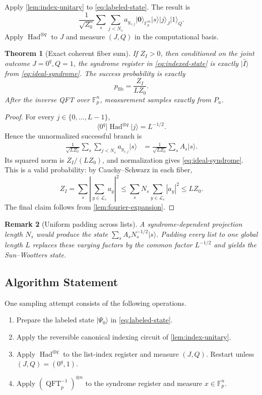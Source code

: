 \documentclass[10pt,a4paper]{amsart}
\newtheorem{theorem}{Theorem}[section]
\newtheorem{remark}[theorem]{Remark}
\newcommand{\F}{\mathbb{F}}
\newcommand{\Lcal}{\mathcal{L}}
\newcommand{\ket}[1]{\lvert #1\rangle}
\newcommand{\abs}[1]{\left\lvert #1\right\rvert}
\newcommand{\QFT}{\operatorname{QFT}}
\newcommand{\Had}{\operatorname{Had}}
\begin{document}
Apply \cref{lem:index-unitary} to \cref{eq:labeled-state}.  The result is
\begin{equation}
   \frac1{\sqrt{Z_0}}
   \sum_s\sum_{j<N_s}a_{y_{s,j}}\ket{\mathbf 0}_{\F_p^m}\ket{s}\ket{j}_J\ket1_Q.
   \label{eq:indexed-state}
\end{equation}
Apply $\Had^{\otimes q}$ to $J$ and measure $(J,Q)$ in the computational basis.

\begin{theorem}[Exact coherent fiber sum]
\label{thm:exact-fiber-sum}
If $Z_I>0$, then conditioned on the joint outcome $J=0^q,Q=1$, the syndrome register in \cref{eq:indexed-state} is exactly $\ket{\widehat I}$ from \cref{eq:ideal-syndrome}.  The success probability is exactly
\begin{equation}
   p_{\mathrm{fib}}=\frac{Z_I}{LZ_0}.
   \label{eq:success-exact}
\end{equation}
After the inverse QFT over $\F_p^n$, measurement samples exactly from $P_u$.
\end{theorem}

\begin{proof}
For every $j\in\{0,\ldots,L-1\}$,
\[
   \langle0^q\vert \Had^{\otimes q}\vert j\rangle=L^{-1/2}.
\]
Hence the unnormalized successful branch is
\begin{align*}
   \frac1{\sqrt{LZ_0}}\sum_s\sum_{j<N_s}a_{y_{s,j}}\ket{s}
   &=\frac1{\sqrt{LZ_0}}\sum_sA_s\ket{s}.
\end{align*}
Its squared norm is $Z_I/(LZ_0)$, and normalization gives \cref{eq:ideal-syndrome}.  This is a valid probability: by Cauchy--Schwarz in each fiber,
\[
   Z_I=\sum_s\abs{\sum_{y\in\Lcal_s}a_y}^2
      \le\sum_sN_s\sum_{y\in\Lcal_s}\abs{a_y}^2
      \le LZ_0.
\]
The final claim follows from \cref{lem:fourier-expansion}.
\end{proof}

\begin{remark}[Uniform padding across lists]
A syndrome-dependent projection length $N_s$ would produce the state
$\sum_s A_sN_s^{-1/2}\ket{s}$.  Padding every list to one global length $L$ replaces these varying factors by the common factor $L^{-1/2}$ and yields the Sun--Wootters state.
\end{remark}

\subsection{Algorithm Statement}

One sampling attempt consists of the following operations.
\begin{enumerate}[label=\textbf{\arabic*.},leftmargin=2.2em]
  \item Prepare the labeled state $\ket{\Psi_0}$ in \cref{eq:labeled-state}.
  \item Apply the reversible canonical indexing circuit of \cref{lem:index-unitary}.
  \item Apply $\Had^{\otimes q}$ to the list-index register and measure $(J,Q)$.  Restart unless $(J,Q)=(0^q,1)$.
  \item Apply $(\QFT_p^{-1})^{\otimes n}$ to the syndrome register and measure $x\in\F_p^n$.
\end{enumerate}
\end{document}
